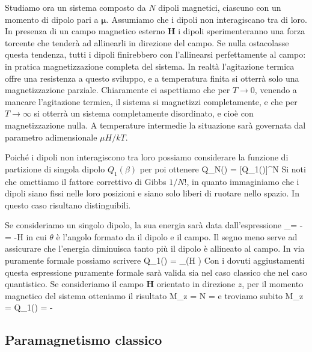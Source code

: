 Studiamo ora un sistema composto da $N$ dipoli magnetici, ciascuno con un momento di dipolo pari a $\pmb{\mu}$. Assumiamo che i dipoli non interagiscano tra di loro. In presenza di un campo magnetico esterno $\mathbf{H}$ i dipoli sperimenteranno una forza torcente che tenderà ad allinearli in direzione del campo. Se nulla ostacolasse questa tendenza, tutti i dipoli finirebbero con l'allinearsi perfettamente al campo: in pratica magnetizzazione completa del sistema. In realtà l'agitazione termica offre una resistenza a questo sviluppo, e a temperatura finita si otterrà solo una magnetizzazione parziale. Chiaramente ci aspettiamo che per $T\to 0$, venendo a mancare l'agitazione termica, il sistema si magnetizzi completamente, e che per $T\to\infty$ si otterrà un sistema completamente disordinato, e cioè con magnetizzazione nulla. A temperature intermedie la situazione sarà governata dal parametro adimensionale $\mu H/kT$.

Poiché i dipoli non interagiscono tra loro possiamo considerare la funzione di partizione di singola dipolo $Q_1(\beta)$ per poi ottenere
\be
Q_N(\beta) = [Q_1(\beta)]^N
\ee
Si noti che omettiamo il fattore correttivo di Gibbs $1/N!$, in quanto immaginiamo che i dipoli siano fissi nelle loro posizioni e siano solo liberi di ruotare nello spazio. In questo caso risultano distinguibili. 

Se consideriamo un singolo dipolo, la sua energia sarà data dall'espressione
\be
\epsilon_\theta = -\pmb{\mu}\cdot{} = -\mu H\cos\theta
\ee
in cui $\theta$ è l'angolo formato da il dipolo e il campo. Il segno meno serve ad assicurare che l'energia diminuisca tanto più il dipolo è allineato al campo. In via puramente formale possiamo scrivere
\be
Q_1(\beta) = \sum_\theta\exp(\beta\mu H \cos\theta)
\ee
Con i dovuti aggiustamenti questa espressione puramente formale sarà valida sia nel caso classico che nel caso quantistico. Se consideriamo il campo $\mathbf{H}$ orientato in direzione $z$, per il momento magnetico del sistema otteniamo il risultato
\be
M_z = N\aspetta{\mu\cos\theta} = 
\ee
e troviamo subito
\be
M_z = \ln Q_1(\beta) = -
\ee


\subsection{Paramagnetismo classico}

